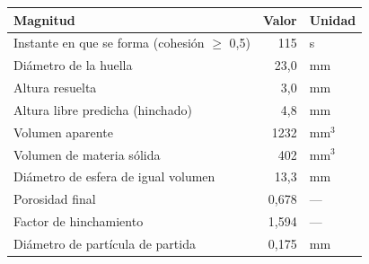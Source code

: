 \begin{tabular}{lrl}
    \hline
    Magnitud & Valor & Unidad \\
    \hline
    Instante en que se forma (cohesión $\geq$ 0,5) & 115 & s \\
    Diámetro de la huella & 23,0 & mm \\
    Altura resuelta & 3,0 & mm \\
    Altura libre predicha (hinchado) & 4,8 & mm \\
    Volumen aparente & 1232 & mm$^3$ \\
    Volumen de materia sólida & 402 & mm$^3$ \\
    Diámetro de esfera de igual volumen & 13,3 & mm \\
    Porosidad final & 0,678 & --- \\
    Factor de hinchamiento & 1,594 & --- \\
    Diámetro de partícula de partida & 0,175 & mm \\
    \hline
\end{tabular}
